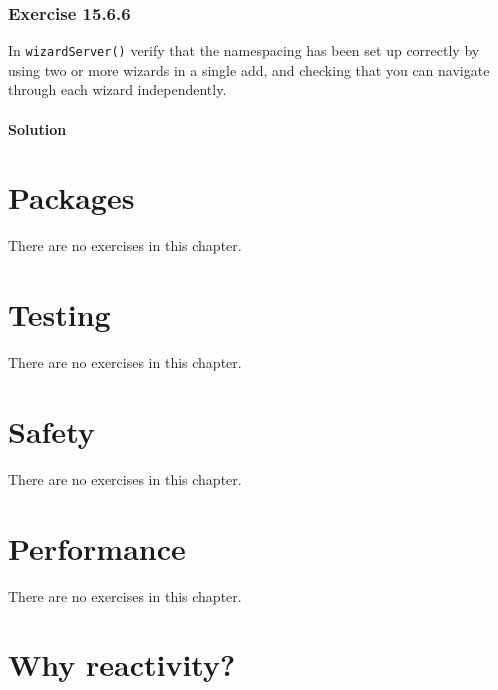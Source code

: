 \documentclass[]{book}
\begin{document}
\hypertarget{exercise-15.6.6}{%
\subsection*{Exercise 15.6.6}\label{exercise-15.6.6}}

In \texttt{wizardServer()} verify that the namespacing has been set up correctly by using two or more wizards in a single add, and checking that you can navigate through each wizard independently.

\begin{solution}

\hypertarget{solution-5}{%
\subsubsection*{Solution}\label{solution-5}}

\end{solution}

\hypertarget{packages}{%
\chapter{Packages}\label{packages}}

There are no exercises in this chapter.

\hypertarget{testing}{%
\chapter{Testing}\label{testing}}

There are no exercises in this chapter.

\hypertarget{safety}{%
\chapter{Safety}\label{safety}}

There are no exercises in this chapter.

\hypertarget{performance}{%
\chapter{Performance}\label{performance}}

There are no exercises in this chapter.

\hypertarget{why-reactivity}{%
\chapter{Why reactivity?}\label{why-reactivity}}
\end{document}
